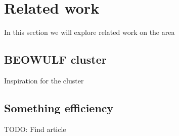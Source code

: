\clearpage
\section{Related work}
In this section we will explore related work on the area
\subsection{BEOWULF cluster}
Inspiration for the cluster
\subsection{Something efficiency}
TODO: Find article
